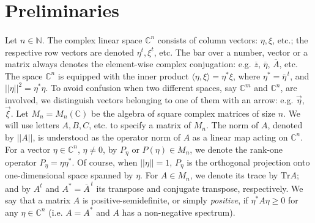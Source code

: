 \documentclass[12pt]{article}
\theoremstyle{plain}
\theoremstyle{definition}
\theoremstyle{remark}
\numberwithin{equation}{section}
\begin{document}
\section{Preliminaries}
\label{sec:Preliminaries}

\paragraph{}
Let $n \in \mathbb{N}$.
The complex linear space $\mathbb{C}^{n}$ consists of column vectors:
$\eta, \xi$, etc.; the respective row vectors are denoted
$\eta^{t}, \xi^{t}$, etc.
The bar over a number, vector or a matrix always denotes
the element-wise complex conjugation: e.g. 
$\overline{z}$, $\overline{\eta}$, $\overline{A}$, etc.
The space $\mathbb{C}^{n}$ is equipped with the inner product
$\langle \eta, \xi \rangle = \eta^{*} \xi$,
where $\eta^{*} = \overline{\eta}^{\,t}$,
and $||\eta||^{2} = \eta^{*} \eta$.
To avoid confusion when two different spaces,
say $\mathbb{C}^{m}$ and $\mathbb{C}^{n}$, are involved,
we distinguish vectors belonging to one of them with an arrow:
e.g. $\vec{\eta}$, $\vec{\xi}$.
Let $M_{n} = M_{n}(\mathbb{C})$ be the algebra
of square complex matrices of size $n$.
We will use letters $A, B, C$, etc. to specify a matrix of $M_{n}$.
The norm of $A$, denoted by $||A||$, is understood as the operator 
norm of $A$ as a linear map acting on $\mathbb{C}^{n}$.
For a vector $\eta \in \mathbb{C}^{n}$, $\eta \neq 0$,
by $P_{\eta}$ or $P({\eta}) \in M_{n}$,
we denote the rank-one operator
$P_{\eta}  =  \eta \eta^{*}$.
Of course, when $||\eta|| = 1$, 
$P_{\eta}$ is the orthogonal projection onto one-dimensional space
spanned by $\eta$.
For $A \in M_{n}$, 
we denote its trace by $\text{Tr} A$;
and by $A^{t}$ and $A^{*} = \overline{A}^{\,t}$ 
its transpose and conjugate transpose, respectively.
We say that a matrix $A$ is positive-semidefinite,
or simply \emph{positive},
if $\eta^{*} A \eta \geq 0$ for any $\eta \in \mathbb{C}^{n}$
(i.e. $A = A^{*}$ and $A$ has a non-negative spectrum).
\end{document}
